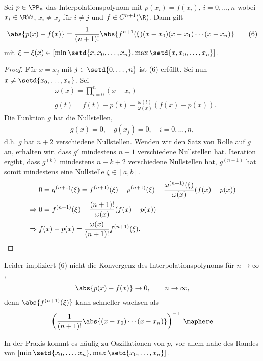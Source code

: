 \begin{prop}
\label{prop:3.4}
Sei $p\in\PP_n$ das Interpolationspolynom mit $p(x_i) = f(x_i)$, $i=0,\ldots,n$
wobei $x_i\in\R\forall i$, $x_i\neq x_j$ für $i\neq j$ und $f\in C^{n+1}(\R)$.
Dann gilt
\begin{align*}
\abs{p(x)-f(x)} =
\frac{1}{(n+1)!}\abs{f^{n+1}(\xi)(x-x_0)(x-x_1)\cdots(x-x_n)}\tag{6}
\end{align*}
mit $\xi = \xi(x)\in\left[\min\setd{x,x_0,\ldots,x_n},
\max\setd{x,x_0,\ldots,x_n}\right] $.\fishhere
\end{prop}
\begin{proof}
Für $x=x_j$ mit $j\in\setd{0,\ldots,n}$ ist (6) erfüllt. Sei nun
$x\neq\setd{x_0,\ldots,x_n}$. Sei
\begin{align*}
&\omega(x) = \prod\limits_{i=0}^n (x-x_i)\\
&g(t) = f(t)-p(t) - \frac{\omega(t)}{\omega(x)}(f(x)-p(x)).
\end{align*}
Die Funktion $g$ hat die Nullstellen,
\begin{align*}
g(x) = 0,\quad g(x_j) = 0,\quad i=0,\ldots,n,
\end{align*}
d.h. $g$ hat $n+2$ verschiedene Nullstellen. Wenden wir den Satz von Rolle
auf $g$ an, erhalten wir, dass $g'$ mindestens $n+1$ verschiedene Nullstellen
hat. Iteration ergibt, dass $g^{(k)}$ mindestens $n-k+2$ verschiedene
Nullstellen hat, $g^{(n+1)}$ hat somit mindestens eine Nullstelle
$\xi\in[a,b]$.
\begin{align*}
&0 = g^{(n+1)}(\xi) = f^{(n+1)}(\xi)-p^{(n+1)}(\xi)
- \frac{\omega^{(n+1)}(\xi)}{\omega(x)}(f(x)-p(x))\\
\Rightarrow\;&0 = f^{(n+1)}(\xi) - \frac{(n+1)!}{\omega(x)}(f(x)-p(x))\\
\Rightarrow\;& f(x)- p(x) = \frac{\omega(x)}{(n+1)!}f^{(n+1)}(\xi).\qedhere
\end{align*} 
\end{proof}

\begin{bemn}[Problem.]
Leider impliziert (6) nicht die Konvergenz des Interpolationspolynoms für
$n\to\infty$,
\begin{align*}
\abs{p(x)-f(x)}\to 0,\qquad n\to\infty,
\end{align*}
denn $\abs{f^{(n+1)}(\xi)}$ kann schneller wachsen als 
\begin{align*}
\left(\frac{1}{(n+1)!}\abs{(x-x_0)\cdots(x-x_n)}\right)^{-1}.\maphere
\end{align*}
\end{bemn}
In der Praxis kommt es häufig zu Oszillationen von $p$, vor allem nahe des
Randes von $\left[\min\setd{x_0,\ldots,x_n},\max\setd{x_0,\ldots,x_n}\right]$.

